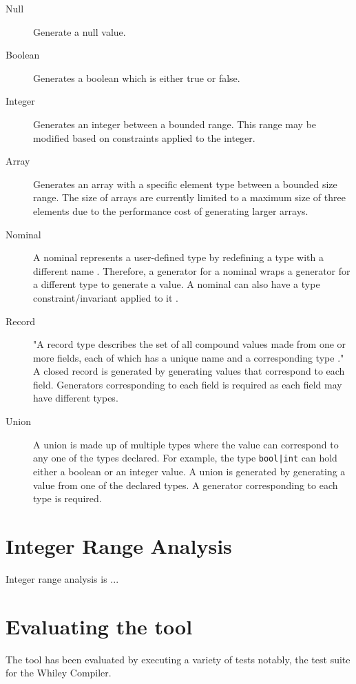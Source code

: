 \begin{description}
	\item[Null] Generate a null value.
	\item[Boolean] Generates a boolean which is either true or false.
	\item[Integer] Generates an integer between a bounded range. This range may be modified based on constraints applied to the integer.
	\item[Array] Generates an array with a specific element type between a bounded size range.
	The size of arrays are currently limited to a maximum size of three elements due to the performance cost of generating larger arrays.
	\item[Nominal] A nominal represents a user-defined type by redefining a type with a different name \cite{WhileyLang}. Therefore, a generator for a nominal wraps a generator for a different type to generate a value. A nominal can also have a type constraint/invariant applied to it \cite{WhileyLang}.
	\item[Record] "A record type describes the set of all compound values made from one or more fields, each of which has a unique name and a corresponding type \cite{WhileyLang}." 
	A closed record is generated by generating values that correspond to each field. Generators corresponding to each field is required as each field may have different types. 
	\item[Union] A union is made up of multiple types where the value can correspond to any one of the types declared. For example, the type \texttt{bool|int} can hold either a boolean or an integer value. 
	A union is generated by generating a value from one of the declared types. A generator corresponding to each type is required. 
\end{description}




\section{Integer Range Analysis}

Integer range analysis is ... 

\section{Evaluating the tool}
The tool has been evaluated by executing a variety of tests notably, the test suite for the Whiley Compiler.
